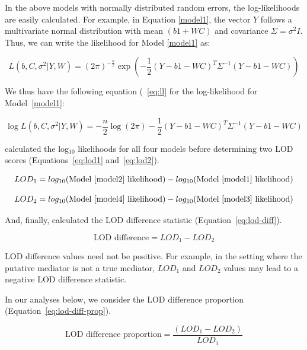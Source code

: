 \documentclass[oneside]{book}\usepackage[]{graphicx}\usepackage[]{color}
\begin{document}
In the above models with normally distributed random errors, the log-likelihoods are easily calculated. For example, in Equation \ref{model1}, the vector $Y$ follows a multivariate normal distribution with mean $(b1 + WC)$ and covariance $\Sigma = \sigma^2I$. Thus, we can write the likelihood for Model \ref{model1} as:

\begin{equation}
    L(b, C, \sigma^2| Y, W) = (2\pi)^{- \frac{n}{2}}\exp{ \left(- \frac{1}{2}(Y - b1 - WC)^T\Sigma^{-1}(Y - b1 - WC)\right)}
\end{equation}

We thus have the following equation (~\ref{eq:ll} for the log-likelihood for Model~\ref{model1}:

\begin{equation}
    \log L(b, C, \sigma^2 | Y, W) = - \frac{n}{2}\log (2\pi) - \frac{1}{2} (Y - b1 - WC)^T\Sigma^{-1}(Y - b1 - WC)\label{eq:ll}
\end{equation}


\citet{chick2016defining} calculated the log$_{10}$ likelihoods for all four models before determining two LOD scores (Equations~\ref{eq:lod1} and~\ref{eq:lod2}).


\begin{equation}
LOD_1 = log_{10}(\text{Model~\ref{model2} likelihood}) - log_{10}(\text{Model~\ref{model1} likelihood})\label{eq:lod1}
\end{equation}

\begin{equation}
LOD_2 = log_{10}(\text{Model~\ref{model4} likelihood}) - log_{10}(\text{Model~\ref{model3} likelihood})\label{eq:lod2}
\end{equation}

And, finally, \citet{chick2016defining} calculated the LOD difference statistic (Equation~\ref{eq:lod-diff}).

\begin{equation}
\text{LOD difference} = LOD_1 - LOD_2\label{eq:lod-diff}
\end{equation}

LOD difference values need not be positive. 
For example, in the setting where the putative mediator is not a true mediator, $LOD_1$ and $LOD_2$ values may lead to a negative LOD difference statistic. 

In our analyses below, we consider the LOD difference proportion (Equation~\ref{eq:lod-diff-prop}).

\begin{equation}
\text{LOD difference proportion} = \frac{(LOD_1 - LOD_2)}{LOD_1}
\label{eq:lod-diff-prop}
\end{equation}
\end{document}
